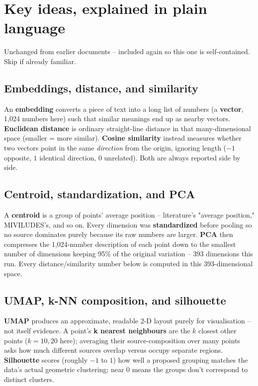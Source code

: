 \documentclass[11pt,a4paper]{article}
\newcommand{\jargon}[1]{\textbf{#1}}
\begin{document}
\section{Key ideas, explained in plain language}
\label{sec:jargon}

Unchanged from earlier documents -- included again so this one is
self-contained. Skip if already familiar.

\subsection{Embeddings, distance, and similarity}
An \jargon{embedding} converts a piece of text into a long list of
numbers (a \jargon{vector}, 1,024 numbers here) such that similar
meanings end up as nearby vectors. \jargon{Euclidean distance} is
ordinary straight-line distance in that many-dimensional space (smaller
= more similar). \jargon{Cosine similarity} instead measures whether two
vectors point in the same \emph{direction} from the origin, ignoring
length ($-1$ opposite, $1$ identical direction, $0$ unrelated). Both are
always reported side by side.

\subsection{Centroid, standardization, and PCA}
A \jargon{centroid} is a group of points' average position -- literature's
"average position," MIVILUDES's, and so on. Every dimension was
\jargon{standardized} before pooling so no source dominates purely
because its raw numbers are larger. \jargon{PCA} then compresses the
1,024-number description of each point down to the smallest number of
dimensions keeping 95\% of the original variation -- 393 dimensions this
run. Every distance/similarity number below is computed in this
393-dimensional space.

\subsection{UMAP, k-NN composition, and silhouette}
\jargon{UMAP} produces an approximate, readable 2-D layout purely for
visualisation -- not itself evidence. A point's \jargon{k nearest
neighbours} are the $k$ closest other points ($k{=}10,20$ here);
averaging their source-composition over many points asks how much
different sources overlap versus occupy separate regions. \jargon{Silhouette}
scores (roughly $-1$ to $1$) how well a proposed grouping matches the
data's actual geometric clustering; near 0 means the groups don't
correspond to distinct clusters.
\end{document}
